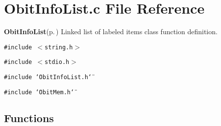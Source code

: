 \section{Obit\-Info\-List.c File Reference}
\label{ObitInfoList_8c}
{\bf Obit\-Info\-List}{\rm (p.\,\pageref{structObitInfoList})} Linked list of labeled items class function definition. 

{\tt \#include $<$string.h$>$}\par
{\tt \#include $<$stdio.h$>$}\par
{\tt \#include \char`\"{}Obit\-Info\-List.h\char`\"{}}\par
{\tt \#include \char`\"{}Obit\-Mem.h\char`\"{}}\par
\subsection*{Functions}
